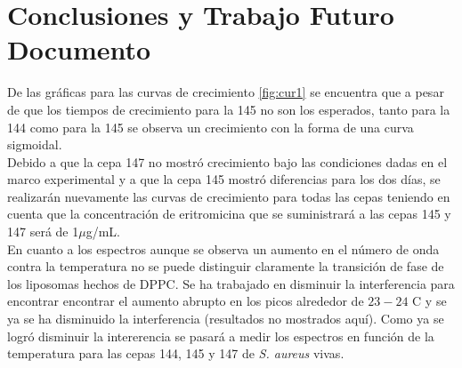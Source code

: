 \documentclass[%
 reprint,
 amsmath,amssymb,
 aps,
]{revtex4-1}
\begin{document}
\section{Conclusiones y Trabajo Futuro Documento}
De las gráficas para las curvas de crecimiento \ref{fig:cur1} se encuentra que a pesar de que los tiempos de crecimiento para la 145 no son los esperados, tanto para la 144 como para la 145 se observa un crecimiento con la forma de una curva sigmoidal.\\
Debido a que la cepa 147 no mostró crecimiento bajo las condiciones dadas en el marco experimental y a que la cepa 145 mostró diferencias para los dos días, se realizarán nuevamente las curvas de crecimiento para todas las cepas teniendo en cuenta que la concentración de eritromicina que se suministrará a las cepas 145 y 147 será de 1$\mu$g/mL.\\
En cuanto a los espectros aunque se observa un aumento en el número de onda contra la temperatura no se puede distinguir claramente la transición de fase de los liposomas hechos de DPPC. Se ha trabajado en disminuir la interferencia para encontrar encontrar el aumento abrupto en los picos alrededor de $23-24$ \textdegree C y se ya se ha disminuido la interferencia (resultados no mostrados aquí). Como ya se logró disminuir la intererencia se pasará a medir los espectros en función de la temperatura para las cepas 144, 145 y 147 de \textit{S. aureus} vivas.\\


\vspace{1cm}
\pagebreak
\pagebreak
\end{document}
